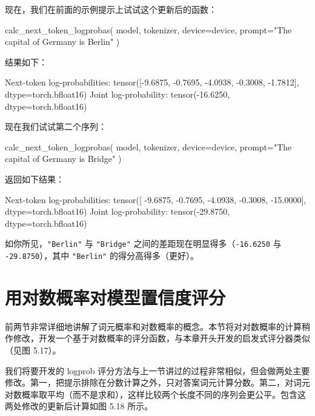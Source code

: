 现在，我们在前面的示例提示上试试这个更新后的函数：

\begin{codebox}
calc_next_token_logprobas(
        model, tokenizer, device=device,
        prompt="The capital of Germany is Berlin"
    )
\end{codebox}

结果如下：

\begin{codebox}
Next-token log-probabilities: tensor([-9.6875, -0.7695, -4.0938,
-0.3008, -1.7812], dtype=torch.bfloat16)
Joint log-probability: tensor(-16.6250, dtype=torch.bfloat16)
\end{codebox}

现在我们试试第二个序列：

\begin{codebox}
calc_next_token_logprobas(
        model, tokenizer, device=device,
        prompt="The capital of Germany is Bridge"
    )
\end{codebox}

返回如下结果：

\begin{codebox}
Next-token log-probabilities: tensor([ -9.6875,  -0.7695,  -4.0938,
-0.3008, -15.0000], dtype=torch.bfloat16)
Joint log-probability: tensor(-29.8750, dtype=torch.bfloat16)
\end{codebox}

如你所见，\texttt{"}\texttt{Berlin}\texttt{"} 与 \texttt{"}\texttt{Bridge}\texttt{"} 之间的差距现在明显得多（\texttt{-16.6250} 与 \texttt{-29.8750}），其中 \texttt{"}\texttt{Berlin}\texttt{"} 的得分高得多（更好）。

\section{用对数概率对模型置信度评分}

前两节非常详细地讲解了词元概率和对数概率的概念。本节将对对数概率的计算稍作修改，开发一个基于对数概率的评分函数，与本章开头开发的启发式评分器类似（见图 5.17）。


我们将要开发的 logprob 评分方法与上一节讲过的过程非常相似，但会做两处主要修改。第一，把提示排除在分数计算之外，只对答案词元计算分数。第二，对词元对数概率取平均（而不是求和），这样比较两个长度不同的序列会更公平。包含这两处修改的更新后计算如图 5.18 所示。


